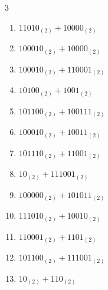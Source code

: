 \begin{multicols}{3}
\begin{enumerate}
  \item $11010_{(2)} + 10000_{(2)}$


  \item $100010_{(2)} + 10000_{(2)}$


\columnbreak %

  \item $100010_{(2)} + 110001_{(2)}$


  \item $10100_{(2)} + 1001_{(2)}$


  \item $101100_{(2)} + 100111_{(2)}$


  \item $100010_{(2)} + 10011_{(2)}$


  \item $101110_{(2)} + 11001_{(2)}$


  \item $10_{(2)} + 111001_{(2)}$


  \item $100000_{(2)} + 101011_{(2)}$


  \item $111010_{(2)} + 10010_{(2)}$


  \item $110001_{(2)} + 1101_{(2)}$


  \item $101100_{(2)} + 111001_{(2)}$


\columnbreak %

  \item $10_{(2)} + 110_{(2)}$



\end{enumerate}
\end{multicols}
